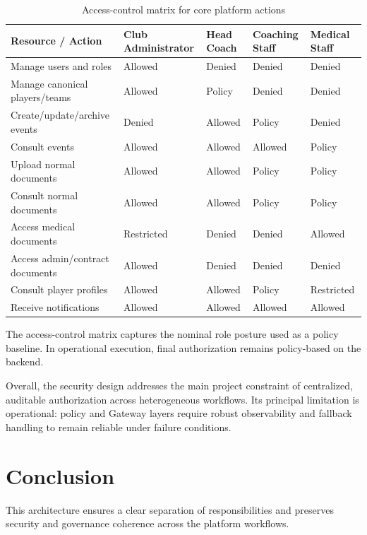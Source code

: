 \begin{table}[ht]
\centering
\caption{Access-control matrix for core platform actions}
\label{tab:access-control-matrix}
\footnotesize
\setlength{\tabcolsep}{4pt}
\renewcommand{\arraystretch}{1.14}
\begin{tabularx}{\textwidth}{|Y|C{2.1cm}|C{2.1cm}|C{2.1cm}|C{2.1cm}|}
\hline
\textbf{Resource / Action} & \textbf{Club Administrator} & \textbf{Head Coach} & \textbf{Coaching Staff} & \textbf{Medical Staff} \\
\hline
Manage users and roles & Allowed & Denied & Denied & Denied \\
\hline
Manage canonical players/teams & Allowed & Policy & Denied & Denied \\
\hline
Create/update/archive events & Denied & Allowed & Policy & Denied \\
\hline
Consult events & Allowed & Allowed & Allowed & Policy \\
\hline
Upload normal documents & Allowed & Allowed & Policy & Policy \\
\hline
Consult normal documents & Allowed & Allowed & Policy & Policy \\
\hline
Access medical documents & Restricted & Denied & Denied & Allowed \\
\hline
Access admin/contract documents & Allowed & Denied & Denied & Denied \\
\hline
Consult player profiles & Allowed & Allowed & Policy & Restricted \\
\hline
Receive notifications & Allowed & Allowed & Allowed & Allowed \\
\hline
\end{tabularx}
\normalsize
\end{table}

The access-control matrix captures the nominal role posture used as a policy
baseline. In operational execution, final authorization remains policy-based on
the backend.

Overall, the security design addresses the main project constraint of
centralized, auditable authorization across heterogeneous workflows. Its
principal limitation is operational: policy and Gateway layers require robust
observability and fallback handling to remain reliable under failure conditions.



\section*{Conclusion}

This architecture ensures a clear separation of responsibilities and preserves
security and governance coherence across the platform workflows.
